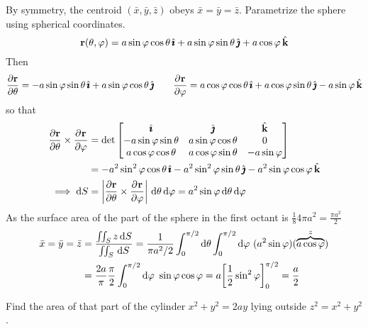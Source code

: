 \begin{solution} 
By symmetry, the centroid $(\bar x,\bar y,\bar z)$
obeys $\bar x=\bar y=\bar z$. Parametrize the sphere
using spherical coordinates.
\begin{equation*}
\mathbf{r}(\theta,\varphi) = a\sin\varphi\cos\theta\,\hat{\pmb{\imath}} 
                     +a\sin\varphi\sin\theta\,\hat{\pmb{\jmath}}
                     +a\cos\varphi\,\hat{\mathbf{k}}
\end{equation*}
Then
\begin{align*}
\pdiff{\vr}{\theta}
       =-a\sin\varphi\sin\theta\,\hi+a\sin\varphi\cos\theta\,\hj\qquad
\pdiff{\vr}{\varphi}
       =a\cos\varphi\cos\theta\,\hi+a\cos\varphi\sin\theta\,\hj
               -a\sin\varphi\,\hk
\end{align*}
so that
\begin{align*}
\pdiff{\vr}{\theta}\times\pdiff{\vr}{\varphi}
&=\det\left[\begin{matrix}
                    \hi   &       \hj               &   \hk   \\
  -a\sin\varphi\sin\theta & a\sin\varphi\cos\theta  & 0       \\
   a\cos\varphi\cos\theta & a\cos\varphi\sin\theta  & -a\sin\varphi
    \end{matrix}\right] 
\\
&=-a^2\sin^2\varphi\cos\theta\,\hi-a^2\sin^2\varphi\sin\theta\,\hj
           -a^2\sin\varphi\cos\varphi\,\hk\\
\implies \dee{S}&=\left|\pdiff{\vr}{\theta}\times\pdiff{\vr}{\varphi}\right|
              \,\dee{\theta}\,\dee{\varphi}
           =a^2\sin\varphi\,\dee{\theta}\,\dee{\varphi}
\end{align*}
As the surface area of the part of the sphere in the first octant is
$\frac{1}{8}4\pi a^2=\frac{\pi a^2}{2}$
\begin{align*}
\bar x=\bar y=\bar z
&=\frac{\dblInt_S z\,\dee{S}}{\dblInt_S\,\dee{S}}
=\frac{1}{\pi a^2/2}\int_0^{\pi/2}\dee{\theta}\int_0^{\pi/2}\dee{\varphi} \ 
(a^2\sin\varphi)(\overbrace{a\cos\varphi}^{z}) \\
&=\frac{2a}{\pi}\frac{\pi}{2}\int_0^{\pi/2}\dee{\varphi} \ \sin\varphi\cos\varphi 
=a\bigg[\frac{1}{2}\sin^2\varphi\bigg]_0^{\pi/2}
=\frac{a}{2}
\end{align*}
\end{solution}

\begin{question}
Find the area of
 that part of the cylinder $x^2+y^2=2ay$ lying outside $z^2=x^2+y^2$. 
\end{question}

